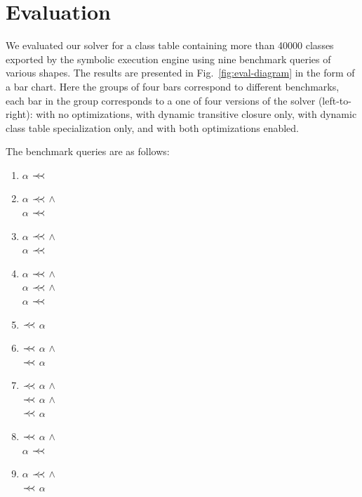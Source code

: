 \section{Evaluation}
\label{sec:eval}

We evaluated our solver for a class table containing more than 40000 classes exported by the symbolic execution engine using
nine benchmark queries of various shapes. The results are presented in Fig.~\ref{fig:eval-diagram} in the form of
a bar chart. Here the groups of four bars correspond to different benchmarks, each bar in the group corresponds to a one of
four versions of the solver (left-to-right): with no optimizations, with dynamic transitive closure only, with dynamic class table specialization only,
and with both optimizations enabled.

The benchmark queries are as follows:

\begin{enumerate}
   \item $\alpha$ $\prec\mathrel{\mkern-5mu}\prec$ 
   \item $\alpha$ $\prec\mathrel{\mkern-5mu}\prec$  $\land$ \\
          $\alpha$ $\prec\mathrel{\mkern-5mu}\prec$ 
    \item $\alpha$ $\prec\mathrel{\mkern-5mu}\prec$  $\land$ \\
          $\alpha$ $\prec\mathrel{\mkern-5mu}\prec$  
    \item $\alpha$ $\prec\mathrel{\mkern-5mu}\prec$  $\land$ \\
          $\alpha$ $\prec\mathrel{\mkern-5mu}\prec$  $\land$ \\
          $\alpha$ $\prec\mathrel{\mkern-5mu}\prec$ 
    \item {} $\prec\mathrel{\mkern-5mu}\prec$ $\alpha$
    \item {} $\prec\mathrel{\mkern-5mu}\prec$ $\alpha$ $\land$ \\
           $\prec\mathrel{\mkern-5mu}\prec$ $\alpha$
    \item {} $\prec\mathrel{\mkern-5mu}\prec$ $\alpha$ $\land$ \\
           $\prec\mathrel{\mkern-5mu}\prec$ $\alpha$ $\land$ \\
           $\prec\mathrel{\mkern-5mu}\prec$ $\alpha$
    \item {} $\prec\mathrel{\mkern-5mu}\prec$ $\alpha$ $\land$ \\
          $\alpha$ $\prec\mathrel{\mkern-5mu}\prec$ 
    \item $\alpha$ $\prec\mathrel{\mkern-5mu}\prec$  $\land$ \\
           $\prec\mathrel{\mkern-5mu}\prec$ $\alpha$
\end{enumerate}


